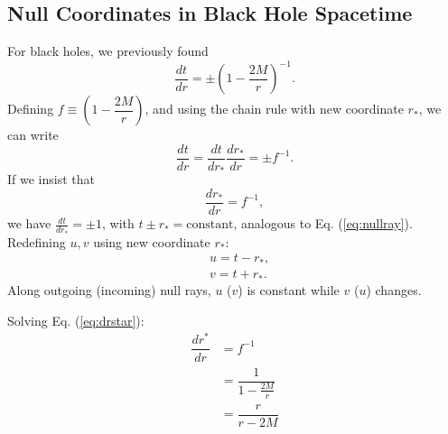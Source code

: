 \documentclass[10pt]{article}
\begin{document}
\begin{itemize}
\begin{figure}[h]
\caption{}
\end{figure}

\subsection{Null Coordinates in Black Hole Spacetime}
For black holes, we previously found 
\begin{equation}
\dfrac{dt}{dr} = \pm \left(1-\dfrac{2M}{r}\right)^{-1}.
\end{equation}
Defining $f \equiv \left(1-\dfrac{2M}{r}\right)$, and using the chain rule with new coordinate $r_*$, we can write
\begin{equation}
\dfrac{dt}{dr} = \dfrac{dt}{dr_*} \dfrac{dr_*}{dr}=\pm f^{-1}.
\end{equation}
If we insist that
\begin{equation}\label{eq:drstar}
\frac{dr_*}{dr}= f^{-1},
\end{equation}
we have  $\frac{dt}{dr_*} = \pm 1$, with $t\pm r_*=\text{constant}$, analogous to Eq. (\ref{eq:nullray}). Redefining $u,v$ using new coordinate $r_*$:
\begin{align}
&u = t-r_*,
\\ &v = t+r_*.
\end{align}
Along outgoing (incoming) null rays, $u$ ($v$) is constant while $v$ ($u$) changes.


Solving Eq. (\ref{eq:drstar}):
\begin{align}
\dfrac{dr^*}{dr} &= f^{-1} 
\\ &= \dfrac{1}{1-\frac{2M}{r}} 
\\ &= \dfrac{r}{r-2M}
\end{align}


\end{itemize}
\end{document}
